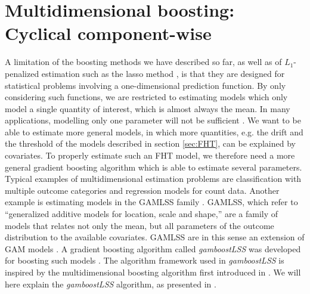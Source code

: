 \section{Multidimensional boosting: Cyclical component-wise}
A limitation of the boosting methods we have described so far, as well as of $L_1$-penalized estimation such as the lasso method \citep{lasso}, is that they are designed for statistical problems involving a one-dimensional prediction function.
By only considering such functions, we are restricted to estimating models which only model a single quantity of interest, which is almost always the mean.
In many applications, modelling only one parameter will not be sufficient \citep{kneib2013}.
We want to be able to estimate more general models, in which more quantities, e.g. the drift and the threshold of the models described in section \ref{sec:FHT}, can be explained by covariates.
To properly estimate such an FHT model, we therefore need a more general gradient boosting algorithm which is able to estimate several parameters.
Typical examples of multidimensional estimation problems are classification with multiple outcome categories and regression models for count data.
Another example is estimating models in the GAMLSS family \citep{gamlss}.
GAMLSS, which refer to ``generalized additive models for location, scale and shape,'' are a family of models that relates not only the mean, but all parameters of the outcome distribution to the available covariates.
GAMLSS are in this sense an extension of GAM models \citep{gam-book}.
A gradient boosting algorithm called \textit{gamboostLSS} was developed for boosting such models \citep{gamboostlss-paper}.
The algorithm framework used in \textit{gamboostLSS} is inspired by the multidimensional boosting algorithm first introduced in \citet{schmid}.
We will here explain the \textit{gamboostLSS} algorithm, as presented in \citet{gamboostlss-paper}.

